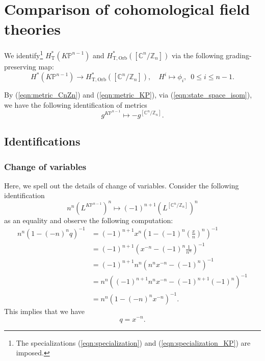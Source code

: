 \documentclass[12pt]{amsart}
\numberwithin{equation}{section}
\newcommand{\CnZn}{[\mathbb{C}^n/\mathbb{Z}_n]}
\newcommand{\KP}{K\mathbb{P}}
\begin{document}
\section{Comparison of cohomological field theories}\label{sec:CohFT_iden}
We identify\footnote{The specializations (\ref{eqn:specialization}) and (\ref{eqn:specialization_KP}) are imposed.} $H_{\mathrm{T}}^*(\KP^{n-1})$ and $H^*_{\mathrm{T,Orb}}(\CnZn)$ via the following grading-preserving map:
\begin{equation}\label{eqn:state_space_isom}
H^*(\KP^{n-1})\to H^*_{\mathrm{T,Orb}}(\CnZn), \quad H^i\mapsto \phi_i, \,\,\, 0\leq i\leq n-1.  \end{equation}

By (\ref{eqn:metric_CnZn}) and (\ref{eqn:metric_KP}), via (\ref{eqn:state_space_isom}), we have the following identification of metrics
\begin{equation}\label{eqn:metric_iden}
g^{\KP^{n-1}}\mapsto -g^{\CnZn}.  
\end{equation}


\subsection{Identifications}\label{sec:iden}
\subsubsection{Change of variables} \label{subsubsec:Change_of_variables}

Here, we spell out the details of change of variables. Consider the following identification
\begin{equation*}
n^n(L^{\KP^{n-1}})^n\mapsto{(-1)^{n+1}}(L^{\CnZn})^{n}
\end{equation*}
as an equality and observe the following computation:
\begin{equation}\label{eqn:L_to_the_n_equal}
\begin{aligned}
n^n(1-(-n)^nq)^{-1}
&=(-1)^{n+1}x^n\left(1-(-1)^n\left(\frac{x}{n}\right)^n\right)^{-1}\\
&=(-1)^{n+1}\left(x^{-n}-(-1)^n\frac{1}{n^n}\right)^{-1}\\
&=(-1)^{n+1}n^n\left(n^nx^{-n}-(-1)^n\right)^{-1}\\
&=n^n\left((-1)^{n+1}n^nx^{-n}-(-1)^{n+1}(-1)^n\right)^{-1}\\
&=n^n\left(1-(-n)^nx^{-n}\right)^{-1}.
\end{aligned}
\end{equation}
This implies that we have
\begin{equation}\label{eqn:variable_change}
    q=x^{-n}.
\end{equation}
\end{document}
